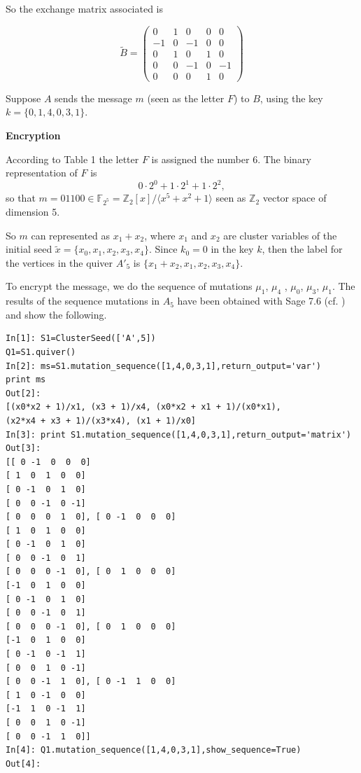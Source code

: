 \documentclass[12pt,a4paper]{article}
\begin{document}
So the exchange matrix associated is 

\begin{equation*}
\tilde{B}=\left( 
\begin{array}{ccccc}
0 & 1 & 0 & 0 & 0 \\
-1 & 0 & -1 & 0 & 0 \\
0 & 1 & 0 & 1 & 0 \\
0 & 0 & -1 & 0 & -1 \\
0 & 0 & 0 & 1 & 0
\end{array}
\right) 
\end{equation*}

\vspace{1cm}

Suppose $A$  sends the message $m$ (seen as the letter $F$) to  $B$, using the key $k=\{ 0,1,4,0,3,1 \}$.

\vspace{0.5cm}

\textbf{Encryption}

\vspace{0.5cm}

According to Table 1 the letter $F$ is assigned the number $6$. The binary representation of $F$ is $$0\cdot 2^0 + 1 \cdot 2^1 + 1\cdot 2^2,$$ so that $m=01100 \in \mathbb{F}_{2^5} = \mathbb{Z}_2[x]/\langle x^5 + x^2 + 1 \rangle$ seen as $\mathbb{Z}_2$ vector space of dimension 5.

So $m$ can represented as $x_1 + x_2$, where $x_1$ and $x_2$ are cluster variables of the initial seed $\tilde{x}=\lbrace x_0,x_1,x_2,x_3,x_4 \rbrace$. Since $k_0=0$ in the key $k$, then the label for the vertices in the quiver $A'_5$ is $\lbrace x_1 + x_2,x_1,x_2,x_3,x_4 \rbrace$.




To encrypt the message, we do the sequence of mutations $\mu_1$, $\mu_4$ , $\mu_0$, $\mu_3$, $\mu_1$. The results of the sequence mutations in $A_5$ have been obtained with Sage 7.6 (cf. \cite{Sage}) and show the following.

\begin{verbatim}
In[1]: S1=ClusterSeed(['A',5])
Q1=S1.quiver()
In[2]: ms=S1.mutation_sequence([1,4,0,3,1],return_output='var')
print ms
Out[2]:
[(x0*x2 + 1)/x1, (x3 + 1)/x4, (x0*x2 + x1 + 1)/(x0*x1), 
(x2*x4 + x3 + 1)/(x3*x4), (x1 + 1)/x0]
In[3]: print S1.mutation_sequence([1,4,0,3,1],return_output='matrix')
Out[3]:
[[ 0 -1  0  0  0]
[ 1  0  1  0  0]
[ 0 -1  0  1  0]
[ 0  0 -1  0 -1]
[ 0  0  0  1  0], [ 0 -1  0  0  0]
[ 1  0  1  0  0]
[ 0 -1  0  1  0]
[ 0  0 -1  0  1]
[ 0  0  0 -1  0], [ 0  1  0  0  0]
[-1  0  1  0  0]
[ 0 -1  0  1  0]
[ 0  0 -1  0  1]
[ 0  0  0 -1  0], [ 0  1  0  0  0]
[-1  0  1  0  0]
[ 0 -1  0 -1  1]
[ 0  0  1  0 -1]
[ 0  0 -1  1  0], [ 0 -1  1  0  0]
[ 1  0 -1  0  0]
[-1  1  0 -1  1]
[ 0  0  1  0 -1]
[ 0  0 -1  1  0]] 
In[4]: Q1.mutation_sequence([1,4,0,3,1],show_sequence=True)
Out[4]:
\end{verbatim}
\end{document}
